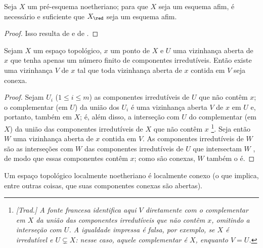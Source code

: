 \documentclass[oneside]{amsart}
\renewcommand{\leq}{\leqslant}
\let\EGAOriginalLabel\label
\renewcommand{\label}[1]{\phantomsection\EGAOriginalLabel{#1}}
\begin{document}
\begin{corollary}[6.1.7]
\label{I.6.1.7}
Seja $X$ um pré-esquema noetheriano;
para que $X$ seja um esquema afim, é necessário e suficiente que $X_\red$ seja um esquema afim.
\end{corollary}

\begin{proof}
Isso resulta de  e de .
\end{proof}

\begin{lemma}[6.1.8]
\label{I.6.1.8}
Sejam $X$ um espaço topológico, $x$ um ponto de $X$ e $U$ uma vizinhança
aberta de $x$ que tenha apenas um número finito de componentes irredutíveis.
Então existe uma vizinhança $V$ de $x$ tal que toda vizinhança aberta de $x$
contida em $V$ seja conexa.
\end{lemma}

\begin{proof}
Sejam $U_i$ ($1\leq i\leq m$) as componentes irredutíveis de $U$ que não
contêm $x$; o complementar (em $U$) da união dos $U_i$ é uma vizinhança
aberta $V$ de $x$ em $U$ e, portanto, também em $X$; é, além disso, a
interseção com $U$ do complementar (em $X$) da união das componentes
irredutíveis de $X$ que não contêm $x$ \footnote{\emph{[Trad.]
A fonte francesa identifica aqui $V$ diretamente com o complementar em $X$ da
união das componentes irredutíveis que não contêm $x$, omitindo a interseção
com $U$. A igualdade impressa é falsa, por exemplo, se $X$ é irredutível e
$U\subsetneq X$: nesse caso, aquele complementar é $X$, enquanto $V=U$.}}.
Seja então $W$ uma vizinhança aberta de $x$ contida em $V$. As componentes
irredutíveis de $W$ são as interseções com $W$ das componentes irredutíveis de
$U$ que intersectam $W$ , de modo que essas componentes
contêm $x$; como são conexas, $W$ também o é.
\end{proof}

\begin{corollary}[6.1.9]
\label{I.6.1.9}
Um espaço topológico localmente noetheriano é localmente conexo (o que
implica, entre outras coisas, que suas componentes conexas são abertas).
\end{corollary}
\end{document}
